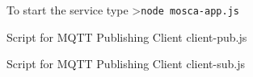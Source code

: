 \documentclass[16pt]{article}
\begin{document}
\begin{enumerate}

To start the service type \textgreater{}\texttt{node mosca-app.js}

Script for MQTT Publishing Client client-pub.js

 

Script for MQTT Publishing Client client-sub.js

 
 


\end{enumerate}
\end{document}
